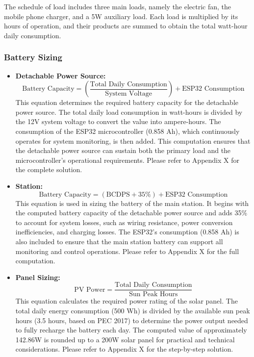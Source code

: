 {The schedule of load includes three main loads, namely the electric fan, the mobile phone charger, and a 5W auxiliary load. Each load is multiplied by its hours of operation, and their products are summed to obtain the total watt-hour daily consumption.

\subsubsection{Battery Sizing}

\begin{itemize}
	\item\textbf{ Detachable Power Source:} 
	\begin{equation}
		\text{Battery Capacity} =
		\left( \frac{\text{Total Daily Consumption}}{\text{System Voltage}} \right)
		+ \text{ESP32 Consumption}
		\label{eq:batterysizing}
	\end{equation}
	This equation determines the required battery capacity for the detachable power source. The total daily load consumption in watt-hours is divided by the 12V system voltage to convert the value into ampere-hours. The consumption of the ESP32 microcontroller (0.858 Ah), which continuously operates for system monitoring, is then added. This computation ensures that the detachable power source can sustain both the primary load and the microcontroller’s operational requirements. Please refer to Appendix X for the complete solution.
	
	\item\textbf{ Station:} 
	\begin{equation}
		\text{Battery Capacity} =
		\left( 
		\text{BCDPS}
		+ 35\%
		\right)
		+ \text{ESP32 Consumption}
		\label{eq:Station}
	\end{equation}
	This equation is used in sizing the battery of the main station. It begins with the computed battery capacity of the detachable power source and adds 35\% to account for system losses, such as wiring resistance, power conversion inefficiencies, and charging losses. The ESP32’s consumption (0.858 Ah) is also included to ensure that the main station battery can support all monitoring and control operations. Please refer to Appendix X for the full computation.
	
	\item\textbf{ Panel Sizing:} 
	\begin{equation}
		\text{PV Power} =
		\frac{\text{Total Daily Consumption}}{\text{Sun Peak Hours}}
		\label{eq:panel}
	\end{equation}
	This equation calculates the required power rating of the solar panel. The total daily energy consumption (500 Wh) is divided by the available sun peak hours (3.5 hours, based on PEC 2017) to determine the power output needed to fully recharge the battery each day. The computed value of approximately 142.86W is rounded up to a 200W solar panel for practical and technical considerations. Please refer to Appendix X for the step-by-step solution.
	

\end{itemize}}
